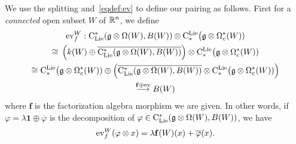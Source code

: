 \documentclass[11pt]{amsart}
\numberwithin{equation}{section}
\begin{document}
We use the splitting and~\eqref{eqdef:ev} to define our pairing as follows. First for a \emph{connected} open subset $W$ of $\mathbb R^n$, we define 
\begin{multline}\label{eq:defevforconnected}
 {\rm ev}_f^W:   {\rm C}_{\rm Lie}^* (\mathfrak g\otimes \Omega (W), B(W)) \otimes {\rm C}^{\rm Lie}_*\big(\mathfrak g \otimes \Omega_c^* (W)) 
 \\ \cong \, \left( k(W) \oplus \overline{{\rm C}_{\rm Lie}^* (\mathfrak g\otimes \Omega (W), B(W))  }\right) 
 \otimes {\rm C}^{\rm Lie}_*\big(\mathfrak g \otimes \Omega_c^* (W))  \\ \cong
 {\rm C}^{\rm Lie}_*\big(\mathfrak g \otimes \Omega_c^* (W))  \oplus  \left(\overline{{\rm C}_{\rm Lie}^* (\mathfrak g\otimes \Omega (W), B(W))  }\otimes {\rm C}^{\rm Lie}_*\big(\mathfrak g \otimes \Omega_c^* (W)) 
 \right) \\
 \stackrel{ \mathbf{f}\oplus {\rm ev}}\longrightarrow  
 B(W)
\end{multline}
where $\mathbf{f}$ is the factorization algebra morphism  we are given.
In other words, if $\varphi = \lambda \mathbf{1} \oplus \overline{\varphi}$ is the decomposition of $\varphi \in  {\rm C}_{\rm Lie}^* (\mathfrak g\otimes \Omega (W), B(W)) $,
we have 
\[ {\rm ev}_f^W(\varphi\otimes x)= \lambda \mathbf{f}(W)(x) + \overline{\varphi}(x). \]


\smallskip
\end{document}
